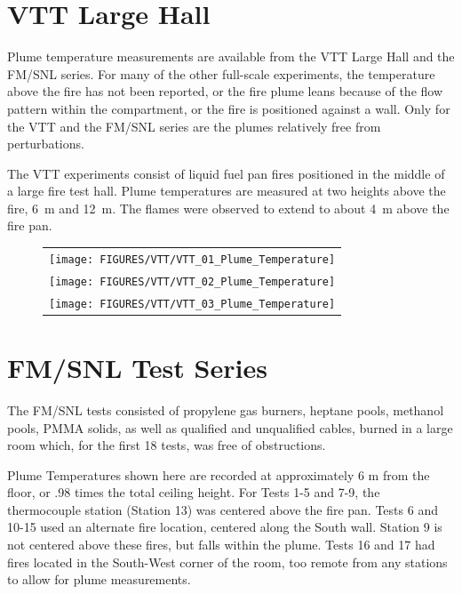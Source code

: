 \clearpage

\section{VTT Large Hall}

\label{VTT_plume}

Plume temperature measurements are available from the VTT Large Hall and the FM/SNL series.
For many of the other full-scale experiments, the temperature above the fire has not been reported, or the fire plume
leans because of the flow pattern within the compartment, or the fire is positioned against a wall.
Only for the VTT and the FM/SNL series are the plumes relatively free from perturbations.

The VTT experiments consist of liquid fuel pan fires positioned in the middle of a large fire test hall.
Plume temperatures are measured at two heights above the fire, 6~m and 12~m.
The flames were observed to extend to about 4~m above the fire pan.


\begin{figure}[h]
\begin{center}
\begin{tabular}{c}
\texttt{[image: FIGURES/VTT/VTT\_01\_Plume\_Temperature]} \\
\texttt{[image: FIGURES/VTT/VTT\_02\_Plume\_Temperature]} \\
\texttt{[image: FIGURES/VTT/VTT\_03\_Plume\_Temperature]} \\
\end{tabular}
\end{center}
\label{VTT_Plume}
\end{figure}


\clearpage

\section{FM/SNL Test Series}

\label{FM/SNL_Plume}

The FM/SNL tests consisted of propylene gas burners, heptane pools, methanol pools, PMMA solids, as well as qualified and unqualified cables, burned in a large room which, for the first 18 tests, was free of obstructions.

Plume Temperatures shown here are recorded at approximately 6 m from the floor, or .98 times the total ceiling height. For Tests 1-5 and 7-9, the thermocouple station (Station 13) was centered above the fire pan. Tests 6 and 10-15 used an alternate fire location, centered along the South wall. Station 9 is not centered above these fires, but falls within the plume. Tests 16 and 17 had fires located in the South-West corner of the room, too remote from any stations to allow for plume measurements.

